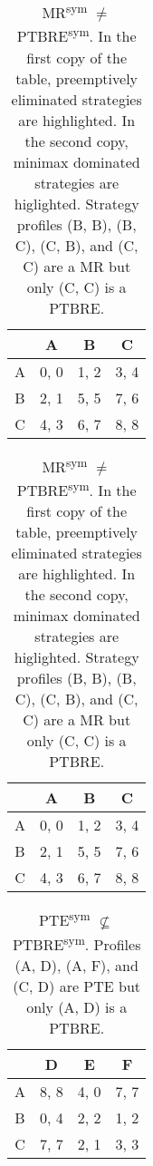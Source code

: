 \begin{table}
	\caption{
		MR\textsuperscript{sym} $\ne$ PTBRE\textsuperscript{sym}.
		In the first copy of the table, preemptively eliminated strategies are highlighted.
		In the second copy, minimax dominated strategies are higlighted.
		Strategy profiles (B, B), (B, C), (C, B), and (C, C) are a MR but only (C, C) is a PTBRE.
	}
	\label{tab:sym-mr-ne-ptbre}
	\centering
	\begin{tabular}{|c|c|c|c|}
		\hline
			& A		& B	   & C	  \\
		\hline
		A 		&\cellcolor{gray!80} 0, 0 &\cellcolor{gray!80} 1, 2 &\cellcolor{gray!80} 3, 4 \\
		\hline
		B		&\cellcolor{gray!80} 2, 1 &\cellcolor{gray!50} 5, 5 &\cellcolor{gray!20} 7, 6 \\
		\hline
		C		&\cellcolor{gray!80} 4, 3 &\cellcolor{gray!20} 6, 7 &\cellcolor{gray!00} 8, 8 \\
		\hline
	\end{tabular}
	\hspace{1em}
	\begin{tabular}{|c|c|c|c|}
		\hline
			& A		& B	   & C	  \\
		\hline
		A 		&\cellcolor{gray!80} 0, 0 &\cellcolor{gray!80} 1, 2 &\cellcolor{gray!80} 3, 4 \\
		\hline
		B		&\cellcolor{gray!80} 2, 1 &\cellcolor{gray!00} 5, 5 &\cellcolor{gray!00} 7, 6 \\
		\hline
		C		&\cellcolor{gray!80} 4, 3 &\cellcolor{gray!00} 6, 7 &\cellcolor{gray!00} 8, 8 \\
		\hline
	\end{tabular}
\end{table}


\begin{table}
	\caption{
		PTE\textsuperscript{sym} $\not\subseteq$ PTBRE\textsuperscript{sym}.
		Profiles (A, D), (A, F), and (C, D) are PTE but only (A, D) is a PTBRE.
	}
	\label{tab:ties-pte-not-sub-ptbre}
	\centering
	\begin{tabular}{|c|c|c|c|}
		\hline
			& D		& E	   & F	  \\
		\hline
		A 		&\cellcolor{gray!00} 8, 8 &\cellcolor{gray!70} 4, 0 &\cellcolor{gray!00} 7, 7 \\
		\hline
		B		&\cellcolor{gray!70} 0, 4 &\cellcolor{gray!70} 2, 2 &\cellcolor{gray!70} 1, 2 \\
		\hline
		C		&\cellcolor{gray!00} 7, 7 &\cellcolor{gray!70} 2, 1 &\cellcolor{gray!70} 3, 3 \\
		\hline
	\end{tabular}
\end{table}
